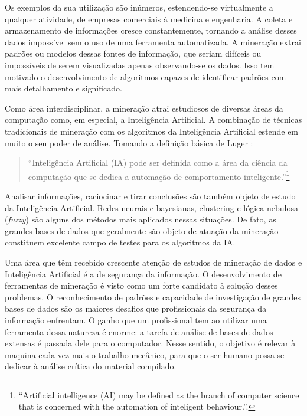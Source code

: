 Os exemplos da sua utilização são inúmeros, estendendo-se virtualmente a qualquer atividade, de empresas comerciais à medicina e engenharia. A coleta e armazenamento de informações cresce constantemente, tornando a análise desses dados impossível sem o uso de uma ferramenta automatizada. A mineração extrai padrões ou modelos dessas fontes de informação, que seriam difíceis ou impossíveis de serem visualizadas apenas observando-se os dados. Isso tem motivado o desenvolvimento de algoritmos capazes de identificar padrões com mais detalhamento e significado.

Como área interdisciplinar, a mineração atrai estudiosos de diversas áreas da computação como, em especial, a Inteligência Artificial. A combinação de técnicas tradicionais de mineração com os algoritmos da Inteligência Artificial estende em muito o seu poder de análise. Tomando a definição básica de Luger \cite[p. 1]{Luger2009}:

\begin{quote}
``Inteligência Artificial (IA) pode ser definida como a área da ciência da computação que se dedica a automação de comportamento inteligente.''\footnote{``Artificial intelligence (AI) may be defined as the branch of computer science that is concerned with the automation of inteligent behaviour.''.}
\end{quote}

Analisar informações, raciocinar e tirar conclusões são também objeto de estudo da Inteligência Artificial. Redes neurais e bayesianas, clustering e lógica nebulosa (\emph{fuzzy}) são alguns dos métodos mais aplicados nessas situações. De fato, as grandes bases de dados que geralmente são objeto de atuação da mineração constituem excelente campo de testes para os algoritmos da IA. 

Uma área que têm recebido crescente atenção de estudos de mineração de dados e Inteligência Artificial é a de segurança da informação. O desenvolvimento de ferramentas de mineração é visto como um forte candidato à solução desses problemas. O reconhecimento de padrões e capacidade de investigação de grandes bases de dados são os maiores desafios que profissionais da segurança da informação enfrentam. O ganho que um profissional tem ao utilizar uma ferramenta dessa natureza é enorme: a tarefa de análise de bases de dados extensas é passada dele para o computador. Nesse sentido, o objetivo é relevar à maquina cada vez mais o trabalho mecânico, para que o ser humano possa se dedicar à análise crítica do material compilado.

